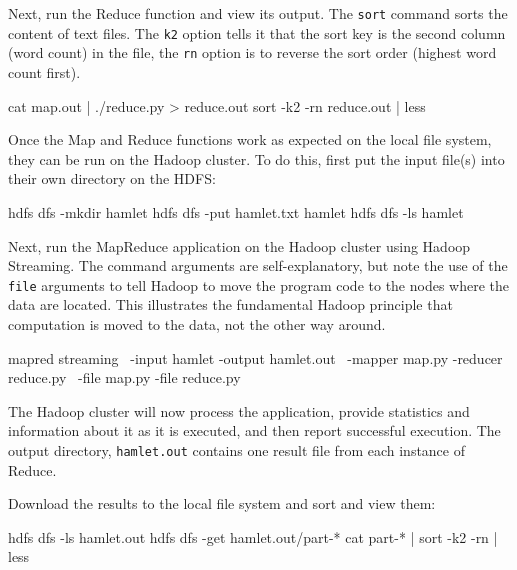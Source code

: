 Next, run the Reduce function and view its output. The \texttt{sort} command sorts the content of text files. The \texttt{k2} option tells it that the sort key is the second column (word count) in the file, the \texttt{rn} option is to reverse the sort order (highest word count first).

\begin{bashcode}
cat map.out | ./reduce.py > reduce.out
sort -k2 -rn reduce.out | less
\end{bashcode}

Once the Map and Reduce functions work as expected on the local file system, they can be run on the Hadoop cluster. To do this, first put the input file(s) into their own directory on the HDFS:

\begin{bashcode}
hdfs dfs -mkdir hamlet
hdfs dfs -put hamlet.txt hamlet
hdfs dfs -ls hamlet
\end{bashcode}

Next, run the MapReduce application on the Hadoop cluster using Hadoop Streaming. The command arguments are self-explanatory, but note the use of the \texttt{file} arguments to tell Hadoop to move the program code to the nodes where the data are located. This illustrates the fundamental Hadoop principle that computation is moved to the data, not the other way around.

\begin{bashcode}
mapred streaming \
  -input hamlet -output hamlet.out \
  -mapper map.py -reducer reduce.py \
  -file map.py -file reduce.py
\end{bashcode}

The Hadoop cluster will now process the application, provide statistics and information about it as it is executed, and then report successful execution. The output directory, \texttt{hamlet.out} contains one result file from each instance of Reduce. 

Download the results to the local file system and sort and view them:

\begin{bashcode}
hdfs dfs -ls hamlet.out
hdfs dfs -get hamlet.out/part-*
cat part-* | sort -k2 -rn | less
\end{bashcode}

